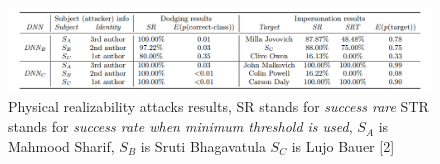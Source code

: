 \begin{figure}[!ht]
  \centering
  \includegraphics[scale=0.5]{Images/real-world-attack.png}
  \caption{Physical realizability attacks results, SR stands for \textit{success rare} STR stands for \textit{success rate when minimum threshold is used}, $S_A$ is Mahmood Sharif, $S_B$ is Sruti Bhagavatula $S_C$ is Lujo Bauer [2]}
  \label{figurelabel}
\end{figure}




